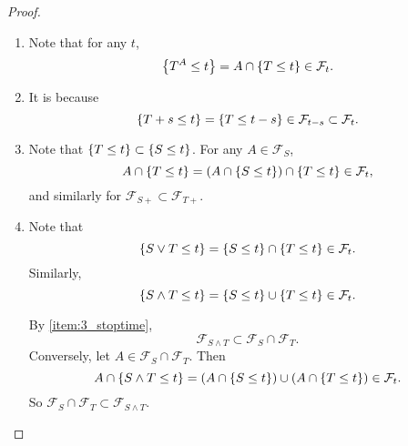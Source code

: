 \begin{proof}
    \begin{enumerate}[label=(\arabic{*})]
        \item Note that for any $t$,
        \begin{equation*}
            \left\{T^A \leq t\right\} = A \cap \left\{T \leq t\right\} \in \mathcal{F}_t.
        \end{equation*}

        \item It is because
        \begin{equation*}
            \left\{T + s \leq t\right\} = \left\{T \leq t - s\right\} \in \mathcal{F}_{t - s} \subset \mathcal{F}_t.
        \end{equation*}

        \item Note that $\left\{T \leq t\right\} \subset \left\{S \leq t\right\}$. For any $A \in \mathcal{F}_S$,
        \begin{equation*}
            A \cap \left\{T \leq t\right\} = \left(A \cap \left\{S \leq t\right\}\right) \cap \left\{T \leq t\right\} \in \mathcal{F}_t,
        \end{equation*}
        and similarly for $\mathcal{F}_{S+} \subset \mathcal{F}_{T+}$.

        \item Note that
        \begin{equation*}
            \left\{S \vee T \leq t\right\} = \left\{S \leq t\right\} \cap \left\{T \leq t\right\} \in \mathcal{F}_t.
        \end{equation*}
        Similarly,
        \begin{equation*}
            \left\{S \wedge T \leq t\right\} = \left\{S \leq t\right\} \cup \left\{T \leq t\right\} \in \mathcal{F}_t.
        \end{equation*}
        
        \noindent By \ref{item:3_stoptime}, 
        \begin{equation*}
            \mathcal{F}_{S \wedge T} \subset \mathcal{F}_S \cap \mathcal{F}_T.
        \end{equation*}
        Conversely, let $A \in \mathcal{F}_S \cap \mathcal{F}_T$. Then
        \begin{equation*}
            A \cap \left\{S \wedge T \leq t\right\} = (A \cap \left\{S \leq t\right\}) \cup (A \cap \left\{T \leq t\right\}) \in \mathcal{F}_t.
        \end{equation*}
        So $\mathcal{F}_S \cap \mathcal{F}_T \subset \mathcal{F}_{S \wedge T}$.


\end{enumerate}
\end{proof}

